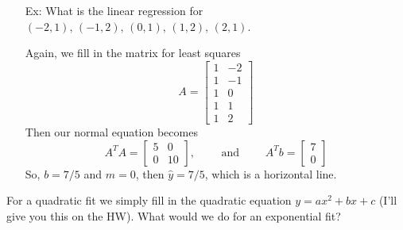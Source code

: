 \documentclass[reqno]{amsart}
\theoremstyle{definition}
\begin{document}
\begin{itemize}
\item[Ex:  ]  What is the linear regression for $(-2,1),\, (-1,2),\, (0,1),\, (1,2),\, (2,1)$.


Again, we fill in the matrix for least squares
%
\begin{equation*}
A = \begin{bmatrix}
1 & -2\\
1 & -1\\
1 & 0\\
1 & 1\\
1 & 2
\end{bmatrix}
\end{equation*}
%
Then our normal equation becomes
%
\begin{equation*}
A^TA = \begin{bmatrix}
5 & 0\\
0 & 10
\end{bmatrix},\qquad \text{  and  } \qquad A^Tb = \begin{bmatrix}
7\\
0
\end{bmatrix}
\end{equation*}
%
So, $b = 7/5$ and $m = 0$, then $\hat{y} = 7/5$, which is a horizontal line.

\end{itemize}

For a quadratic fit we simply fill in the quadratic equation $y = ax^2 + bx + c$ (I'll give you this on the HW).  What would we do for an exponential fit?
\end{document}
